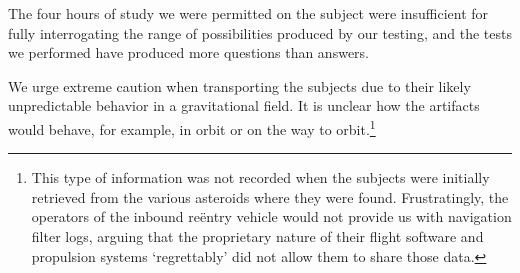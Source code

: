 \documentclass[10pt]{article}
\theoremstyle{definition}
\begin{document}
The four hours of study we were permitted on the subject were insufficient for fully interrogating the range of possibilities produced by our testing, and the tests we performed have produced more questions than answers.

We urge extreme caution when transporting the subjects due to their likely unpredictable behavior in a gravitational field.
It is unclear how the artifacts would behave, for example, in orbit or on the way to orbit.\footnote{This type of information was not recorded when the subjects were initially retrieved from the various asteroids where they were found. Frustratingly, the operators of the inbound re\"entry vehicle would not provide us with navigation filter logs, arguing that the proprietary nature of their flight software and propulsion systems `regrettably' did not allow them to share those data.}

%
%
\end{document}
